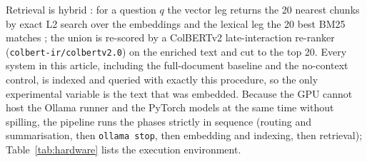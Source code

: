 \documentclass[pdflatex,sn-mathphys-num]{sn-jnl}
\theoremstyle{thmstyleone}%
\theoremstyle{thmstylethree}%
\begin{document}
Retrieval is hybrid \cite{kiran2025hybrid,wang2024searching}: for a question $q$ the vector leg returns the 20 nearest chunks by exact L2 search over the embeddings and the lexical leg the 20 best BM25 matches \cite{robertson1995okapi,robertson2009bm25}; the union is re-scored by a ColBERTv2 late-interaction re-ranker \cite{khattab2020colbert,santhanam2022colbertv2} (\texttt{colbert-ir/colbertv2.0}) on the enriched text and cut to the top 20. Every system in this article, including the full-document baseline and the no-context control, is indexed and queried with exactly this procedure, so the only experimental variable is the text that was embedded. Because the GPU cannot host the Ollama runner and the PyTorch models at the same time without spilling, the pipeline runs the phases strictly in sequence (routing and summarisation, then \texttt{ollama stop}, then embedding and indexing, then retrieval); Table~\ref{tab:hardware} lists the execution environment.
\end{document}
